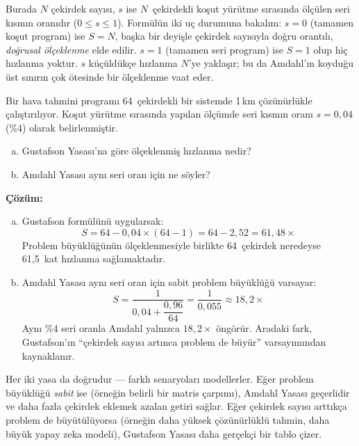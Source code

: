 \noindent Burada $N$ çekirdek sayısı, $s$ ise $N$~çekirdekli koşut yürütme sırasında ölçülen seri kısmın oranıdır ($0 \le s \le 1$). Formülün iki uç durumuna bakalım: $s = 0$ (tamamen koşut program) ise $S = N$, başka bir deyişle çekirdek sayısıyla doğru orantılı, \emph{doğrusal ölçeklenme} elde edilir. $s = 1$ (tamamen seri program) ise $S = 1$ olup hiç hızlanma yoktur. $s$ küçüldükçe hızlanma $N$'ye yaklaşır; bu da Amdahl'ın koyduğu üst sınırın çok ötesinde bir ölçeklenme vaat eder.

\begin{ornek}[2.11]
Bir hava tahmini programı 64~çekirdekli bir sistemde 1\,km çözünürlükle çalıştırılıyor. Koşut yürütme sırasında yapılan ölçümde seri kısmın oranı $s = 0{,}04$ (\%4) olarak belirlenmiştir.
\begin{enumerate}[(a)]
    \item Gustafson Yasası'na göre ölçeklenmiş hızlanma nedir?
    \item Amdahl Yasası aynı seri oran için ne söyler?
\end{enumerate}

\textbf{Çözüm:}
\begin{enumerate}[(a)]
    \item Gustafson formülünü uygularsak:
    \[
    S = 64 - 0{,}04 \times (64 - 1) = 64 - 2{,}52 = 61{,}48\times
    \]
    Problem büyüklüğünün ölçeklenmesiyle birlikte 64~çekirdek neredeyse 61,5~kat hızlanma sağlamaktadır.

    \item Amdahl Yasası aynı seri oran için sabit problem büyüklüğü varsayar:
    \[
    S = \frac{1}{0{,}04 + \dfrac{0{,}96}{64}} = \frac{1}{0{,}055} \approx 18{,}2\times
    \]
    Aynı \%4 seri oranla Amdahl yalnızca $18{,}2\times$ öngörür. Aradaki fark, Gustafson'ın ``çekirdek sayısı artınca problem de büyür'' varsayımından kaynaklanır.
\end{enumerate}
\end{ornek}

\begin{bilginot}
Her iki yasa da doğrudur --- farklı senaryoları modellerler. Eğer problem büyüklüğü \emph{sabit} ise (örneğin belirli bir matris çarpımı), Amdahl Yasası geçerlidir ve daha fazla çekirdek eklemek azalan getiri sağlar. Eğer çekirdek sayısı arttıkça problem de büyütülüyorsa (örneğin daha yüksek çözünürlüklü tahmin, daha büyük yapay zeka modeli), Gustafson Yasası daha gerçekçi bir tablo çizer.
\end{bilginot}

